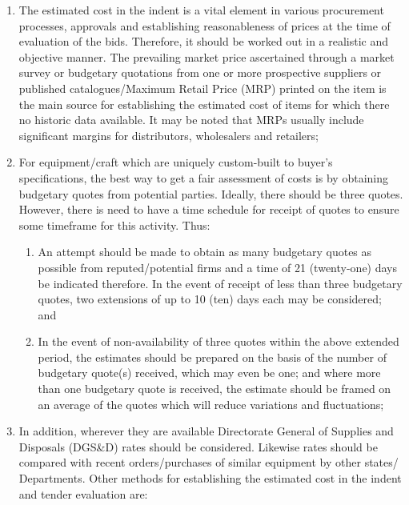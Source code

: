 \documentclass[
  10pt,
  twoside]{article}
\providecommand{\tightlist}{%
  \setlength{\itemsep}{0pt}\setlength{\parskip}{0pt}}
\begin{document}
\begin{enumerate}
\def\labelenumi{\arabic{enumi}.}
\item
  The estimated cost in the indent is a vital element in various
  procurement processes, approvals and establishing reasonableness of
  prices at the time of evaluation of the bids. Therefore, it should be
  worked out in a realistic and objective manner. The prevailing market
  price ascertained through a market survey or budgetary quotations from
  one or more prospective suppliers or published catalogues/Maximum
  Retail Price (MRP) printed on the item is the main source for
  establishing the estimated cost of items for which there no historic
  data available. It may be noted that MRPs usually include significant
  margins for distributors, wholesalers and retailers;
\item
  For equipment/craft which are uniquely custom-built to buyer's
  specifications, the best way to get a fair assessment of costs is by
  obtaining budgetary quotes from potential parties. Ideally, there
  should be three quotes. However, there is need to have a time schedule
  for receipt of quotes to ensure some timeframe for this activity.
  Thus:

  \begin{enumerate}
  \def\labelenumii{\alph{enumii})}
  \tightlist
  \item
    An attempt should be made to obtain as many budgetary quotes as
    possible from reputed/potential firms and a time of 21 (twenty-one)
    days be indicated therefore. In the event of receipt of less than
    three budgetary quotes, two extensions of up to 10 (ten) days each
    may be considered; and
  \item
    In the event of non-availability of three quotes within the above
    extended period, the estimates should be prepared on the basis of
    the number of budgetary quote(s) received, which may even be one;
    and where more than one budgetary quote is received, the estimate
    should be framed on an average of the quotes which will reduce
    variations and fluctuations;
  \end{enumerate}
\item
  In addition, wherever they are available Directorate General of
  Supplies and Disposals (DGS\&D) rates should be considered. Likewise
  rates should be compared with recent orders/purchases of similar
  equipment by other states/ Departments. Other methods for establishing
  the estimated cost in the indent and tender evaluation are:


\end{enumerate}
\end{document}
